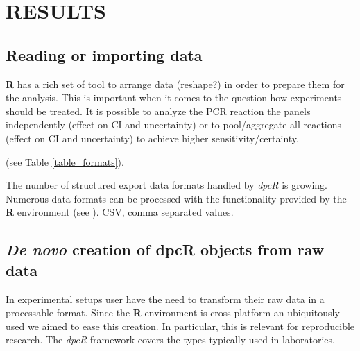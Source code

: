 \documentclass[a4,center,fleqn]{NAR}
\begin{document}
\section{RESULTS}

\subsection{Reading or importing data}

\textbf{R} has a rich set of tool to arrange data (reshape?) in order to prepare them for 
the analysis. This is important when it comes to the question how experiments 
should be treated. It is possible to analyze the PCR reaction the panels 
independently (effect on CI and uncertainty) or to pool/aggregate all reactions 
(effect on CI and uncertainty) to achieve higher sensitivity/certainty.


(see Table \ref{table_formats}).

\begin{table}[b]
{The number of structured export data formats handled by \textit{dpcR} is growing. Numerous data 
formats can be processed with the functionality provided by the \textbf{R} 
environment (see \cite{rodiger_r_2015}). CSV, comma separated values.
} \end{table}

\subsection{\textit{De novo} creation of dpcR objects from raw data}

In experimental setups user have the need to transform their raw data in a 
processable format. Since the \textbf{R} environment is cross-platform an 
ubiquitously used we aimed to ease this creation. In particular, this is 
relevant for reproducible research. The \textit{dpcR} framework covers the types 
typically used in laboratories.
\end{document}

